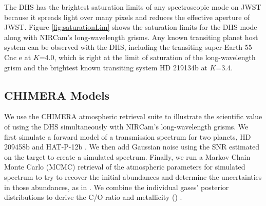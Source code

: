 \documentclass[iop]{emulateapj}
\begin{document}
The DHS has the brightest saturation limits of any spectroscopic mode on JWST because it
spreads light over many pixels and reduces the effective aperture of JWST.
Figure \ref{fig:saturationLim} shows the saturation limits for the DHS mode along with NIRCam's long-wavelength grisms.
Any known transiting planet host system can be observed with the DHS, including the transiting super-Earth  55 Cnc e \citep{mcarthur2004disc55cnce} at $K$=4.0, which is right at the limit of saturation of the long-wavelength grism and the brightest known transiting system HD 219134b \citep{motalebi2015hd219134b} at $K$=3.4.


\subsection{CHIMERA Models}\label{sec:models}

We use the CHIMERA atmospheric retrieval suite \citep{line2013chimera,line2014CtOsecE} to illustrate the scientific value of using the DHS simultaneously with NIRCam's long-wavelength grisms.
We first simulate a forward model of a transmission spectrum for two planets, HD 209458b \citep{henry00,charbonneau00} and HAT-P-12b \citep{hartman2009hatp12}.
We then add Gaussian noise using the SNR estimated on the target to create a simulated spectrum.
Finally, we run a Markov Chain Monte Carlo (MCMC) retrieval of the atmospheric parameters for simulated spectrum to try to recover the initial abundances and determine the uncertainties in those abundances, as in \citet{greene2016jwst_trans}.
We combine the individual gases' posterior distributions to derive the C/O ratio and metallicity (\citet{greene2016jwst_trans}) .
\end{document}
